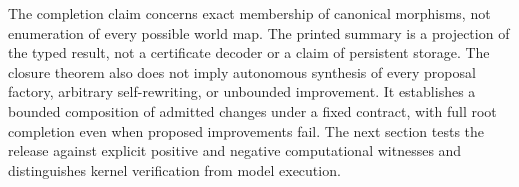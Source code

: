 The completion claim concerns exact membership of canonical morphisms, not enumeration of every possible world map. The printed summary is a projection of the typed result, not a certificate decoder or a claim of persistent storage. The closure theorem also does not imply autonomous synthesis of every proposal factory, arbitrary self-rewriting, or unbounded improvement. It establishes a bounded composition of admitted changes under a fixed contract, with full root completion even when proposed improvements fail. The next section tests the release against explicit positive and negative computational witnesses and distinguishes kernel verification from model execution.
